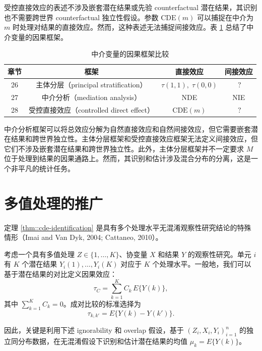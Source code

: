 受控直接效应的表述不涉及嵌套潜在结果或先验 counterfactual 潜在结果，其识别也不需要跨世界 counterfactual 独立性假设。参数 $\mathrm{CDE}(m)$ 可以捕捉在中介为 $m$ 时处理对结果的直接效应。然而，这种表述无法捕捉间接效应。表 \ref{tab::mediation-frameworks} 总结了中介变量的因果框架。

\begin{table}[H]
\centering
\caption{中介变量的因果框架比较}
\label{tab::mediation-frameworks}
\begin{tabular}{cccc}
\toprule
章节 & 框架 & 直接效应 & 间接效应 \\
\midrule
26 & 主体分层（principal stratification） & $\tau(1,1),\;\tau(0,0)$ & $\ ?$ \\
27 & 中介分析（mediation analysis） & NDE & NIE \\
28 & 受控直接效应（controlled direct effect） & $\mathrm{CDE}(m)$ & $\ ?$ \\
\bottomrule
\end{tabular}
\end{table}

中介分析框架可以将总效应分解为自然直接效应和自然间接效应，但它需要嵌套潜在结果和跨世界独立性。主体分层框架和受控直接效应框架无法定义间接效应，但它们不涉及嵌套潜在结果和跨世界独立性。此外，主体分层框架并不一定要求 $M$ 位于处理到结果的因果通路上。然而，其识别和估计涉及混合分布的分离，这是一个非平凡的统计任务。

\section{多值处理的推广}
\label{sec::multi-valued-treatment}

定理 \ref{thm::cde-identification} 是具有多个处理水平无混淆观察性研究结论的特殊情形（Imai and Van Dyk, 2004; Cattaneo, 2010）。

考虑一个具有多值处理 $Z\in\{1,\ldots,K\}$、协变量 $X$ 和结果 $Y$ 的观察性研究。单元 $i$ 有 $K$ 个潜在结果 $Y_i(1),\ldots,Y_i(K)$ 对应于 $K$ 个处理水平。一般地，我们可以基于潜在结果的对比定义因果效应：
\begin{equation}
\tau_C = \sum_{k=1}^{K} C_k\,E\{Y(k)\},
\end{equation}
其中 $\sum_{k=1}^{K}C_k=0$。成对比较的标准选择为
\begin{equation}
\tau_{k,k'} = E\{Y(k)-Y(k')\}.
\end{equation}

因此，关键是利用下述 ignorability 和 overlap 假设，基于 $(Z_i,X_i,Y_i)_{i=1}^{n}$ 的独立同分布数据，在无混淆假设下识别和估计潜在结果的均值 $\mu_k=E\{Y(k)\}$。


